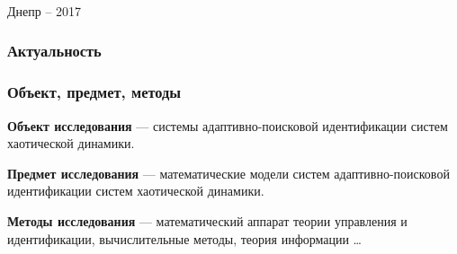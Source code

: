 \documentclass[10pt,utf8]{beamer}
\author{\dissauthorRu}
\title[Семинар -- 2017]{\booknameRu}
\begin{document}
\begin{frame}
  \frametitle{}
  \begin{center}
    {\Large \color{blue} \booknameRu}

    \vfill

    {\large \dissauthorMain}

    \vfill

    Днепр -- 2017
  \end{center}
\end{frame}


\begin{frame}
  \frametitle{Актуальность}


\end{frame}



\begin{frame}
  \frametitle{Объект, предмет, методы}

\textbf{Объект исследования} ---
системы адаптивно-поисковой идентификации систем хаотической динамики.

\smallskip

\textbf{Предмет исследования} ---
математические модели систем адаптивно-поисковой идентификации систем хаотической динамики.

\smallskip

\textbf{Методы исследования} ---
математический аппарат теории управления и идентификации,
вычислительные методы,
теория информации
\ldots

\end{frame}




\begin{frame}
  \frametitle{}


\end{frame}




\begin{frame}
  \frametitle{}


\end{frame}
\end{document}
